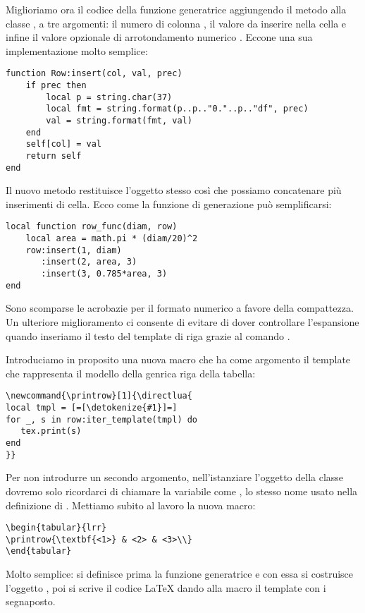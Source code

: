 Miglioriamo ora il codice della funzione generatrice aggiungendo il metodo
 alla classe , a tre argomenti: il numero di colonna
, il valore da inserire nella cella  e infine il valore
opzionale di arrotondamento numerico . Eccone una sua implementazione
molto semplice:
\begin{Verbatim}
function Row:insert(col, val, prec)
    if prec then
        local p = string.char(37)
        local fmt = string.format(p..p.."0."..p.."df", prec)
        val = string.format(fmt, val)
    end
    self[col] = val
    return self
end
\end{Verbatim}

Il nuovo metodo restituisce l'oggetto stesso così che possiamo concatenare più
inserimenti di cella. Ecco come la funzione di generazione può semplificarsi:
\begin{Verbatim}
local function row_func(diam, row)
    local area = math.pi * (diam/20)^2
    row:insert(1, diam)
       :insert(2, area, 3)
       :insert(3, 0.785*area, 3)
end
\end{Verbatim}

Sono scomparse le acrobazie per il formato numerico a favore della compattezza.
Un ulteriore miglioramento ci consente di evitare di dover controllare
l'espansione quando inseriamo il testo del template di riga grazie al comando
.

Introduciamo in proposito una nuova macro  che ha come argomento il
template che rappresenta il modello della genrica riga della tabella:
\begin{Verbatim}
\newcommand{\printrow}[1]{\directlua{
local tmpl = [=[\detokenize{#1}]=]
for _, s in row:iter_template(tmpl) do
   tex.print(s)
end
}}
\end{Verbatim}

Per non introdurre un secondo argomento, nell'istanziare l'oggetto della classe
 dovremo solo ricordarci di chiamare la variabile come , lo
stesso nome usato nella definizione di . Mettiamo subito al lavoro
la nuova macro:
\begin{Verbatim}
\begin{tabular}{lrr}
\printrow{\textbf{<1>} & <2> & <3>\\}
\end{tabular}
\end{Verbatim}

Molto semplice: si definisce prima la funzione generatrice e con essa si
costruisce l'oggetto , poi si scrive il codice \LaTeX{} dando alla
macro  il template con i segnaposto.

